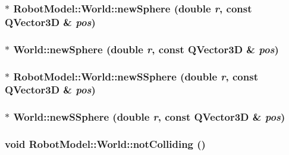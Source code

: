 \label{class_robot_model_1_1_world_a36ee6c4337fbe9097f2bc30a1843cdb5}
\hypertarget{class_robot_model_1_1_world_a5bdceb8e105d9cff94df86e3dd1cd80a}{
\subsubsection[{newSphere}]{$\ast$ RobotModel::World::newSphere (double {\em r}, \/  const QVector3D \& {\em pos})}}
\label{class_robot_model_1_1_world_a5bdceb8e105d9cff94df86e3dd1cd80a}
\hypertarget{class_robot_model_1_1_world_af9b942f5df468adf15a285b509bc69e5}{
\subsubsection[{newSphere}]{ $\ast$ World::newSphere (double {\em r}, \/  const QVector3D \& {\em pos})}}
\label{class_robot_model_1_1_world_af9b942f5df468adf15a285b509bc69e5}
\hypertarget{class_robot_model_1_1_world_a5f65aab98a5d0320b387fe576bc0dc08}{
\subsubsection[{newSSphere}]{$\ast$ RobotModel::World::newSSphere (double {\em r}, \/  const QVector3D \& {\em pos})}}
\label{class_robot_model_1_1_world_a5f65aab98a5d0320b387fe576bc0dc08}
\hypertarget{class_robot_model_1_1_world_aee6474d33f4ec03a15fa908f06db9748}{
\subsubsection[{newSSphere}]{ $\ast$ World::newSSphere (double {\em r}, \/  const QVector3D \& {\em pos})}}
\label{class_robot_model_1_1_world_aee6474d33f4ec03a15fa908f06db9748}
\hypertarget{class_robot_model_1_1_world_ac0ee5060cc743f6ffb991dc86dbff43e}{
\subsubsection[{notColliding}]{\setlength{\rightskip}{0pt plus 5cm}void RobotModel::World::notColliding ()}}
\label{class_robot_model_1_1_world_ac0ee5060cc743f6ffb991dc86dbff43e}


